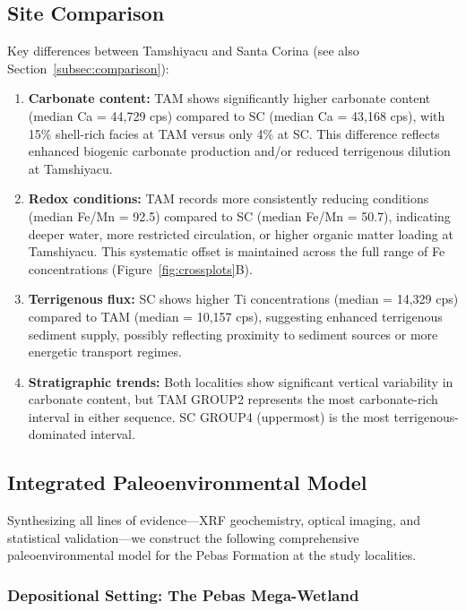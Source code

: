 \documentclass[11pt,a4paper]{article}
\newcommand{\FeMn}{Fe/Mn}
\begin{document}
\subsection{Site Comparison}

Key differences between Tamshiyacu and Santa Corina (see also Section~\ref{subsec:comparison}):

\begin{enumerate}
    \item \textbf{Carbonate content:} TAM shows significantly higher carbonate content (median Ca = 44,729 cps) compared to SC (median Ca = 43,168 cps), with 15\% shell-rich facies at TAM versus only 4\% at SC. This difference reflects enhanced biogenic carbonate production and/or reduced terrigenous dilution at Tamshiyacu.

    \item \textbf{Redox conditions:} TAM records more consistently reducing conditions (median \FeMn{} = 92.5) compared to SC (median \FeMn{} = 50.7), indicating deeper water, more restricted circulation, or higher organic matter loading at Tamshiyacu. This systematic offset is maintained across the full range of Fe concentrations (Figure~\ref{fig:crossplots}B).

    \item \textbf{Terrigenous flux:} SC shows higher Ti concentrations (median = 14,329 cps) compared to TAM (median = 10,157 cps), suggesting enhanced terrigenous sediment supply, possibly reflecting proximity to sediment sources or more energetic transport regimes.

    \item \textbf{Stratigraphic trends:} Both localities show significant vertical variability in carbonate content, but TAM GROUP2 represents the most carbonate-rich interval in either sequence. SC GROUP4 (uppermost) is the most terrigenous-dominated interval.
\end{enumerate}

\subsection{Integrated Paleoenvironmental Model}

Synthesizing all lines of evidence---XRF geochemistry, optical imaging, and statistical validation---we construct the following comprehensive paleoenvironmental model for the Pebas Formation at the study localities.

\subsubsection{Depositional Setting: The Pebas Mega-Wetland}
\end{document}
